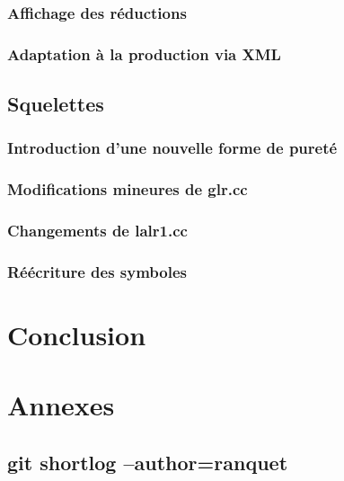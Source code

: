 \documentclass[a4paper,11pt,twoside,final]{article}
\begin{document}
  \subsubsection{Affichage des réductions}
  \subsubsection{Adaptation à la production via XML}

  \subsection{Squelettes}
  \subsubsection{Introduction d'une nouvelle forme de pureté}
  \subsubsection{Modifications mineures de glr.cc}
  \subsubsection{Changements de lalr1.cc}
  \subsubsection{Réécriture des symboles}

  \cleardoublepage
  \section{Conclusion}

  \cleardoublepage
  \section{Annexes}

  \subsection{git shortlog --author=ranquet}
  \begin{adjustwidth}{-2cm}{-2cm}
  \end{adjustwidth}

  \cleardoublepage
  \cleardoublepage
\end{document}
